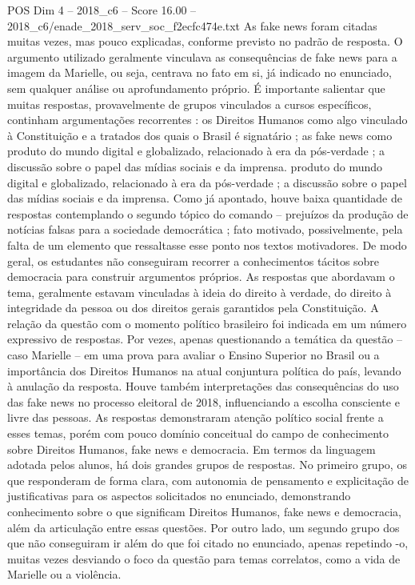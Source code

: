\begin{textsample}{POS Dim 4 – 2018\_c6 – Score 16.00 – 2018\_c6/enade\_2018\_serv\_soc\_f2ecfc474e.txt}
As fake news foram citadas muitas vezes, mas pouco explicadas, conforme previsto no padrão de resposta.
O argumento utilizado geralmente vinculava as consequências de fake news para a imagem da Marielle, ou seja, centrava no fato em si, já indicado no enunciado, sem qualquer análise ou aprofundamento próprio.
É importante salientar que muitas respostas, provavelmente de grupos vinculados a cursos específicos, continham argumentações recorrentes : os Direitos Humanos como algo vinculado à Constituição e a tratados dos quais o Brasil é signatário ; as fake news como produto do mundo digital e globalizado, relacionado à era da pós-verdade ; a discussão sobre o papel das mídias sociais e da imprensa. produto do mundo digital e globalizado, relacionado à era da pós-verdade ; a discussão sobre o papel das mídias sociais e da imprensa.
Como já apontado, houve baixa quantidade de respostas contemplando o segundo tópico do comando – prejuízos da produção de notícias falsas para a sociedade democrática ; fato motivado, possivelmente, pela falta de um elemento que ressaltasse esse ponto nos textos motivadores.
De modo geral, os estudantes não conseguiram recorrer a conhecimentos tácitos sobre democracia para construir argumentos próprios.
As respostas que abordavam o tema, geralmente estavam vinculadas à ideia do direito à verdade, do direito à integridade da pessoa ou dos direitos gerais garantidos pela Constituição.
A relação da questão com o momento político brasileiro foi indicada em um número expressivo de respostas.
Por vezes, apenas questionando a temática da questão – caso Marielle – em uma prova para avaliar o Ensino Superior no Brasil ou a importância dos Direitos Humanos na atual conjuntura política do país, levando à anulação da resposta.
Houve também interpretações das consequências do uso das fake news no processo eleitoral de 2018, influenciando a escolha consciente e livre das pessoas.
As respostas demonstraram atenção político social frente a esses temas, porém com pouco domínio conceitual do campo de conhecimento sobre Direitos Humanos, fake news e democracia.
Em termos da linguagem adotada pelos alunos, há dois grandes grupos de respostas.
No primeiro grupo, os que responderam de forma clara, com autonomia de pensamento e explicitação de justificativas para os aspectos solicitados no enunciado, demonstrando conhecimento sobre o que significam Direitos Humanos, fake news e democracia, além da articulação entre essas questões.
Por outro lado, um segundo grupo dos que não conseguiram ir além do que foi citado no enunciado, apenas repetindo -o, muitas vezes desviando o foco da questão para temas correlatos, como a vida de Marielle ou a violência.

\end{textsample}
